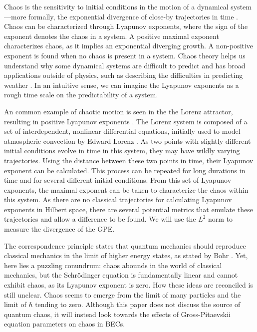 Chaos is the sensitivity to initial conditions in the motion of a dynamical system---more formally, the exponential divergence of close-by trajectories in time \cite{vulpiani2009chaos}. Chaos can be characterized through Lyapunov exponents, where the sign of the exponent denotes the chaos in a system. A positive maximal exponent characterizes chaos, as it implies an exponential diverging growth. A non-positive exponent is found when no chaos is present in a system. Chaos theory helps us understand why some dynamical systems are difficult to predict and has broad applications outside of physics, such as describing the difficulties in predicting weather \cite{DeterministicNonperiodicFlow}. In an intuitive sense, we can imagine the Lyapunov exponents as a rough time scale on the predictability of a system.

An common example of chaotic motion is seen in the the Lorenz attractor, resulting in positive Lyapunov exponents \cite{DeterministicNonperiodicFlow}. The Lorenz system is composed of a set of interdependent, nonlinear differential equations, initially used to model atmospheric convection by Edward Lorenz \cite{DeterministicNonperiodicFlow}. As two points with slightly different initial conditions evolve in time in this system, they may have wildly varying trajectories. Using the distance between these two points in time, their Lyapunov exponent can be calculated. This process can be repeated for long durations in time and for several different initial conditions. From this set of Lyapunov exponents, the maximal exponent can be taken to characterize the chaos within this system. As there are no classical trajectories for calculating Lyapunov exponents in Hilbert space, there are several potential metrics that emulate these trajectories and allow a difference to be found. We will use the $L^2$ norm to measure the divergence of the GPE.

The correspondence principle states that quantum mechanics should reproduce classical mechanics in the limit of higher energy states, as stated by Bohr \cite{bohr_n_1920_2051363}. Yet, here lies a puzzling conundrum: chaos abounds in the world of classical mechanics, but the Schr\"odinger equation is fundamentally linear and cannot exhibit chaos, as its Lyapunov exponent is zero. How these ideas are reconciled is still unclear. Chaos seems to emerge from the limit of many particles and the limit of $\hbar$ tending to zero. Although this paper does not discuss the source of quantum chaos, it will instead look towards the effects of Gross-Pitaevskii equation parameters on chaos in BECs.

